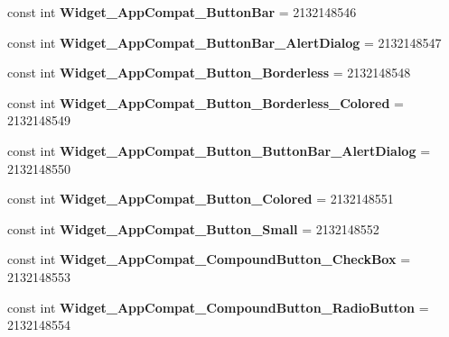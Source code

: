\begin{DoxyCompactItemize}
const int {\bfseries Widget\+\_\+\+App\+Compat\+\_\+\+Button\+Bar} = 2132148546
\item 
\mbox{\label{classst_delivery_1_1_resource_1_1_style_a0c11863d852b0e3b6c996bacfd361fa6}} 
const int {\bfseries Widget\+\_\+\+App\+Compat\+\_\+\+Button\+Bar\+\_\+\+Alert\+Dialog} = 2132148547
\item 
\mbox{\label{classst_delivery_1_1_resource_1_1_style_a6ab38ed816fea762ff6ccd891478beba}} 
const int {\bfseries Widget\+\_\+\+App\+Compat\+\_\+\+Button\+\_\+\+Borderless} = 2132148548
\item 
\mbox{\label{classst_delivery_1_1_resource_1_1_style_a5cbca209ef4b91ae1ea52b3d783cd9f2}} 
const int {\bfseries Widget\+\_\+\+App\+Compat\+\_\+\+Button\+\_\+\+Borderless\+\_\+\+Colored} = 2132148549
\item 
\mbox{\label{classst_delivery_1_1_resource_1_1_style_ad525938324c544c88a07138778d32354}} 
const int {\bfseries Widget\+\_\+\+App\+Compat\+\_\+\+Button\+\_\+\+Button\+Bar\+\_\+\+Alert\+Dialog} = 2132148550
\item 
\mbox{\label{classst_delivery_1_1_resource_1_1_style_a49da257f45b60859f271ffaacbc9218d}} 
const int {\bfseries Widget\+\_\+\+App\+Compat\+\_\+\+Button\+\_\+\+Colored} = 2132148551
\item 
\mbox{\label{classst_delivery_1_1_resource_1_1_style_a3135f77426f06c2e995928b4a46d4576}} 
const int {\bfseries Widget\+\_\+\+App\+Compat\+\_\+\+Button\+\_\+\+Small} = 2132148552
\item 
\mbox{\label{classst_delivery_1_1_resource_1_1_style_a3f4a306ebf9ef9bec0266b022da46ad7}} 
const int {\bfseries Widget\+\_\+\+App\+Compat\+\_\+\+Compound\+Button\+\_\+\+Check\+Box} = 2132148553
\item 
\mbox{\label{classst_delivery_1_1_resource_1_1_style_a0719e9db25cc20e708c838c4fae6c77a}} 
const int {\bfseries Widget\+\_\+\+App\+Compat\+\_\+\+Compound\+Button\+\_\+\+Radio\+Button} = 2132148554

\end{DoxyCompactItemize}
